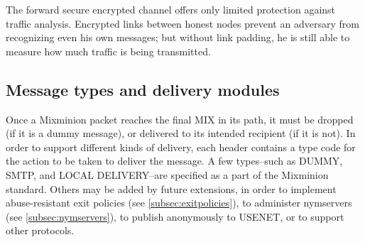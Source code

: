 \documentclass{llncs}
\begin{document}
The forward secure encrypted channel offers only limited protection
against traffic analysis. Encrypted links between honest nodes prevent
an adversary from recognizing even his own messages; but without
link padding, he is still able to measure how much traffic is being
transmitted.

\subsection{Message types and delivery modules}

Once a Mixminion packet reaches the final MIX in its path, it must be
dropped (if it is a dummy message), or delivered to its intended
recipient (if it is not).  In order to support different kinds of
delivery, each header contains a type code for the action to be taken
to deliver the message.  A few types--such as DUMMY, SMTP, and LOCAL
DELIVERY--are specified as a part of the Mixminion standard.  Others
may be added by future extensions, in order to implement
abuse-resistant exit policies (see \ref{subsec:exitpolicies}), to
administer nymservers (see \ref{subsec:nymservers}), to publish
anonymously to USENET, or to support other protocols.

\end{document}
